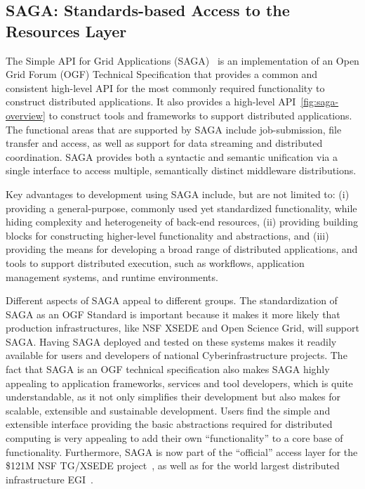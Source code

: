 \documentclass[]{svjour3}
\begin{document}

 

\subsection{SAGA: Standards-based Access to the Resources Layer}

The Simple API for Grid Applications (SAGA)~\cite{saga_url} is an
implementation of an Open Grid Forum (OGF) Technical Specification
that provides a common and consistent high-level API for the most
commonly required functionality to construct distributed
applications. It also provides a high-level
API~\ref{fig:saga-overview} to construct tools and frameworks to
support distributed applications. The functional areas that are
supported by SAGA include job-submission, file transfer and access, as
well as support for data streaming and distributed coordination.  SAGA
provides both a syntactic and semantic unification via a single
interface to access multiple, semantically distinct middleware
distributions.

Key advantages to development using SAGA include, but are not limited to:
(i) providing a general-purpose, commonly used yet standardized functionality, while
hiding complexity and heterogeneity of back-end resources, (ii)
providing building blocks for constructing higher-level functionality
and abstractions, and (iii) providing the means for developing a broad
range of distributed applications, and tools to support distributed
execution, such as workflows, application management systems, and runtime environments.

Different aspects of SAGA appeal to different groups. The
standardization of SAGA as an OGF Standard is important because it
makes it more likely that production infrastructures, like NSF XSEDE
and Open Science Grid, will support SAGA. Having SAGA deployed and
tested on these systems makes it readily available for users and
developers of national Cyberinfrastructure projects. The fact that
SAGA is an OGF technical specification also makes SAGA highly
appealing to application frameworks, services and tool developers,
which is quite understandable, as it not only simplifies their
development but also makes for scalable, extensible and sustainable
development. Users find the simple and extensible interface providing
the basic abstractions required for distributed computing is very
appealing to add their own “functionality” to a core base of
functionality. Furthermore, SAGA is now part of the “official” access
layer for the \$121M NSF TG/XSEDE project~\cite{XSEDE}, as well as for
the world largest distributed infrastructure EGI~\cite{EGI}.
\end{document}
